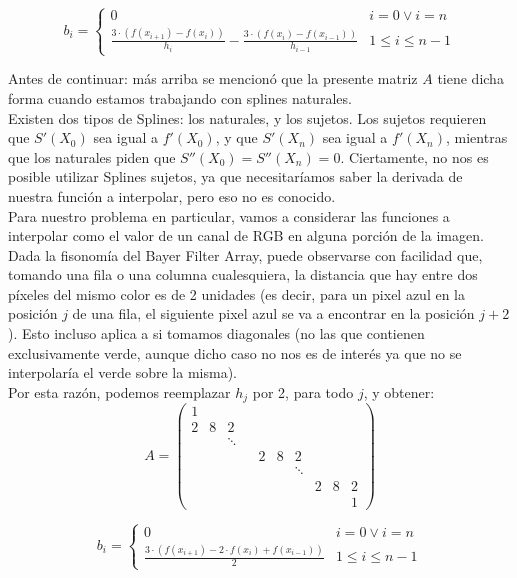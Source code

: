 \documentclass[a4paper]{article}
\begin{document}
\[
b_i =
\begin{cases}
0 & i = 0 \lor i = n \\
\frac{3\cdot(f(x_{i+1})-f(x_i))}{h_i} - \frac{3\cdot(f(x_i)-f(x_{i-1}))}{h_{i-1}} & 1 \leq i \leq n-1
\end{cases}
\]

\bigskip
Antes de continuar: más arriba se mencionó que la presente matriz $A$ tiene dicha forma cuando estamos trabajando con splines naturales.\\
Existen dos tipos de Splines: los naturales, y los sujetos. Los sujetos requieren que $S'(X_0)$ sea igual a $f'(X_0)$, y que $S'(X_n)$ sea igual a $f'(X_n)$, mientras que los naturales piden que $S''(X_0) = S''(X_n) = 0$. Ciertamente, no nos es posible utilizar Splines sujetos, ya que necesitaríamos saber la derivada de nuestra función a interpolar, pero eso no es conocido.\\

Para nuestro problema en particular, vamos a considerar las funciones a interpolar como el valor de un canal de RGB en alguna porción de la imagen. Dada la fisonomía del Bayer Filter Array, puede observarse con facilidad que, tomando una fila o una columna cualesquiera, la distancia que hay entre dos píxeles del mismo color es de 2 unidades (es decir, para un pixel azul en la posición $j$ de una fila, el siguiente pixel azul se va a encontrar en la posición $j+2$). Esto incluso aplica a si tomamos diagonales (no las que contienen exclusivamente verde, aunque dicho caso no nos es de interés ya que no se interpolaría el verde sobre la misma). \\
Por esta razón, podemos reemplazar $h_j$ por 2, para todo $j$, y obtener: \\

\[
A = \left(
\begin{array}{cccccccccc}
1 &  &  &  &  &  &  & &  & \\
2 & 8 & 2 &   & & & & &  & \\
 &  & \ddots &  &  &  &  &  &  &  \\
 &  &  &  & 2 & 8 & 2 & &  & \\
 &  &  &  &  &  & \ddots &  &  &  \\
 &  &  &  &  & & & 2 & 8 & 2\\
 &  &  &  &  &  &  &  &  & 1
\end{array}
\right)
\]

\bigskip

\[
b_i =
\begin{cases}
0 & i = 0 \lor i = n \\
\frac{3\cdot(f(x_{i+1})-2\cdot f(x_i)+f(x_{i-1}))}{2} & 1 \leq i \leq n-1
\end{cases}
\]
\end{document}
